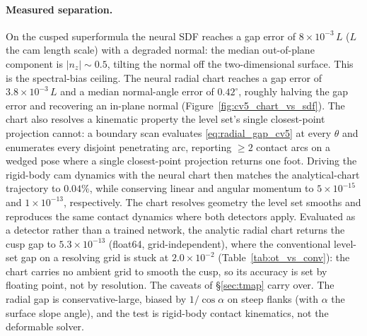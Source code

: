 \documentclass{svjour3}                 %
\begin{document}
\paragraph{Measured separation.} On the cusped superformula the neural SDF reaches a gap error of
$8\times10^{-3}\,L$ ($L$ the cam length scale) with a degraded normal: the median out-of-plane
component is $\lvert n_z\rvert\sim 0.5$, tilting the normal off the two-dimensional surface. This is the
spectral-bias ceiling. The neural radial chart reaches a gap error of
$3.8\times10^{-3}\,L$ and a median normal-angle error of $0.42^{\circ}$, roughly halving the gap error
and recovering an in-plane normal (Figure~\ref{fig:cv5_chart_vs_sdf}). The chart also resolves a kinematic property the level set's single
closest-point projection cannot: a boundary scan evaluates \eqref{eq:radial_gap_cv5} at every $\theta$
and enumerates every disjoint penetrating arc, reporting $\ge 2$ contact arcs on a wedged pose where a
single closest-point projection returns one foot. Driving the rigid-body cam dynamics with the neural
chart then matches the analytical-chart trajectory to $0.04\%$, while conserving linear and angular
momentum to $5\times10^{-15}$ and $1\times10^{-13}$, respectively. The chart resolves geometry the level
set smooths and reproduces the same contact dynamics where both detectors apply. Evaluated as a detector
rather than a trained network, the analytic radial chart returns the cusp gap to $5.3\times10^{-13}$ (float64,
grid-independent), where the conventional level-set gap on a resolving grid is stuck at $2.0\times10^{-2}$
(Table~\ref{tab:ot_vs_conv}): the chart carries no ambient grid to smooth the cusp, so its accuracy is set by
floating point, not by resolution. The caveats of
\S\ref{sec:tmap} carry over. The radial gap is conservative-large, biased by
$1/\cos\alpha$ on steep flanks (with $\alpha$ the surface slope angle), and the test is rigid-body
contact kinematics, not the deformable solver.
\end{document}
